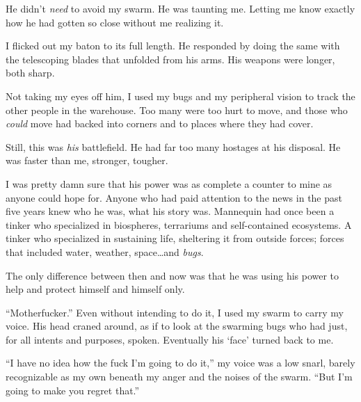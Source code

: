 He didn't \emph{need} to avoid my swarm.  He was taunting me.  Letting me know exactly how he had gotten so close without me realizing it.



I flicked out my baton to its full length.  He responded by doing the same with the telescoping blades that unfolded from his arms.  His weapons were longer, both sharp.



Not taking my eyes off him, I used my bugs and my peripheral vision to track the other people in the warehouse.  Too many were too hurt to move, and those who \emph{could} move had backed into corners and to places where they had cover.



Still, this was \emph{his} battlefield.  He had far too many hostages at his disposal.  He was faster than me, stronger, tougher.



I was pretty damn sure that his power was as complete a counter to mine as anyone could hope for.  Anyone who had paid attention to the news in the past five years knew who he was, what his story was.  Mannequin had once been a tinker who specialized in biospheres, terrariums and self-contained ecosystems.  A tinker who specialized in sustaining life, sheltering it from outside forces; forces that included water, weather, space\ldots and \emph{bugs}.



The only difference between then and now was that he was using his power to help and protect himself and himself only.



``Motherfucker.''  Even without intending to do it, I used my swarm to carry my voice.  His head craned around, as if to look at the swarming bugs who had just, for all intents and purposes, spoken.  Eventually his `face' turned back to me.



``I have no idea how the fuck I'm going to do it,'' my voice was a low snarl, barely recognizable as my own beneath my anger and the noises of the swarm.  ``But I'm going to make you regret that.''





